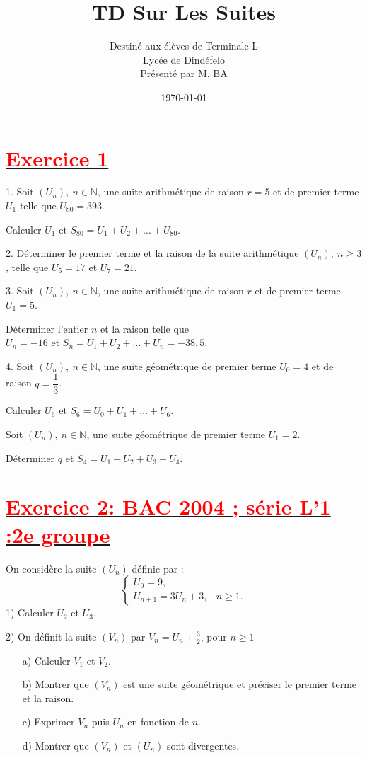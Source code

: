 \documentclass[12pt]{article}
\author{Destiné aux élèves de Terminale L\\Lycée de Dindéfelo\\Présenté par M. BA}
\title{\textbf{TD Sur Les Suites}}
\date{\today}
\begin{document}
\maketitle
\newpage
\section*{\underline{\textbf{\textcolor{red}{Exercice 1}}}}
1. Soit $\left(U_{n}\right),\ n\in\mathbb{N}$, une suite arithmétique de raison $r=5$ et de premier terme $U_{1}$ telle que $U_{80}=393$.
	
Calculer $U_{1}$ et $S_{80}=U_{1}+U_{2}+\ldots+U_{80}$.
	
2. Déterminer le premier terme et la raison de la suite arithmétique $\left(U_{n}\right),\ n\geq 3$, telle que $U_{5}=17$ et $U_{7}=21$.
	
3. Soit $\left(U_{n}\right),\ n\in\mathbb{N}$, une suite arithmétique de raison $r$ et de premier terme $U_{1}=5$.
	
Déterminer l'entier $n$ et la raison telle que\\ $U_{n}=-16$ et $S_{n}=U_{1}+U_{2}+\ldots+U_{n}=-38,5$.
	
4. Soit $\left(U_{n}\right),\ n\in\mathbb{N}$, une suite géométrique de premier terme $U_{0}=4$ et de raison $q=\dfrac{1}{3}$.
	
Calculer $U_{6}$ et $S_{6}=U_{0}+U_{1}+\ldots+U_{6}$.
	
Soit $\left(U_{n}\right),\ n\in\mathbb{N}$, une suite géométrique de premier terme $U_{1}=2$.
	
Déterminer $q$ et $S_{4}=U_{1}+U_{2}+U_{3}+U_{4}$.
\section*{\underline{\textbf{\textcolor{red}{Exercice 2: BAC 2004 ; série L’1 :2e groupe}}}}
On considère la suite $(U_n)$ définie par :
\[
\begin{cases}
    U_0 = 9, \\
    U_{n+1} = 3U_n + 3, & n \geq 1.
\end{cases}
\]
1) Calculer $U_2$ et $U_3$.

2) On définit la suite $(V_n)$ par $V_n = U_n + \frac{3}{2}$, pour $n\geq1$
\begin{enumerate}
    \item[a)] Calculer $V_1$ et $V_2$.
    
    \item[b)] Montrer que $(V_n)$ est une suite géométrique et préciser le premier terme et la raison.
    
    \item[c)] Exprimer $V_n$ puis $U_n$ en fonction de $n$.
    
    \item[d)] Montrer que $(V_n)$ et $(U_n)$ sont divergentes.
\end{enumerate}
\end{document}
